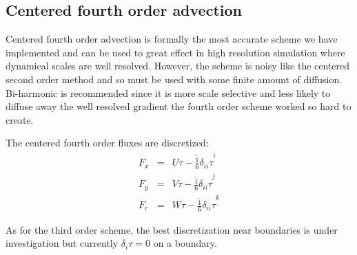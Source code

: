 
\subsection{Centered fourth order advection}

Centered fourth order advection is formally the most accurate scheme
we have implemented and can be used to great effect in high resolution
simulation where dynamical scales are well resolved. However, the
scheme is noisy like the centered second order method and so must be
used with some finite amount of diffusion. Bi-harmonic is recommended
since it is more scale selective and less likely to diffuse away the
well resolved gradient the fourth order scheme worked so hard to
create.

The centered fourth order fluxes are discretized:
\begin{eqnarray}
F_x & = & U \overline{\tau - \frac{1}{6} \delta_{ii} \tau}^i \\
F_y & = & V \overline{\tau - \frac{1}{6} \delta_{ii} \tau}^j \\
F_r & = & W \overline{\tau - \frac{1}{6} \delta_{ii} \tau}^k
\end{eqnarray}

As for the third order scheme, the best discretization near boundaries
is under investigation but currently $\delta_i \tau=0$ on a boundary.

